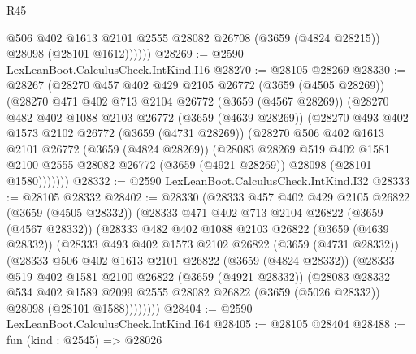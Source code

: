 \begin{lexlean}{R45}
\begin{coremodule}
              @506
              @402
              @1613
              @2101
              @2555
              @28082
              @26708
              (@3659 (@4824 @28215))
              @28098
              (@28101 @1612))))))
@28269 := @2590 LexLeanBoot.CalculusCheck.IntKind.I16
@28270 := @28105 @28269
@28330 := @28267
    (@28270
      @457
      @402
      @429
      @2105
      @26772
      (@3659 (@4505 @28269))
      (@28270
        @471
        @402
        @713
        @2104
        @26772
        (@3659 (@4567 @28269))
        (@28270
          @482
          @402
          @1088
          @2103
          @26772
          (@3659 (@4639 @28269))
          (@28270
            @493
            @402
            @1573
            @2102
            @26772
            (@3659 (@4731 @28269))
            (@28270
              @506
              @402
              @1613
              @2101
              @26772
              (@3659 (@4824 @28269))
              (@28083
                @28269
                @519
                @402
                @1581
                @2100
                @2555
                @28082
                @26772
                (@3659 (@4921 @28269))
                @28098
                (@28101 @1580)))))))
@28332 := @2590 LexLeanBoot.CalculusCheck.IntKind.I32
@28333 := @28105 @28332
@28402 := @28330
    (@28333
      @457
      @402
      @429
      @2105
      @26822
      (@3659 (@4505 @28332))
      (@28333
        @471
        @402
        @713
        @2104
        @26822
        (@3659 (@4567 @28332))
        (@28333
          @482
          @402
          @1088
          @2103
          @26822
          (@3659 (@4639 @28332))
          (@28333
            @493
            @402
            @1573
            @2102
            @26822
            (@3659 (@4731 @28332))
            (@28333
              @506
              @402
              @1613
              @2101
              @26822
              (@3659 (@4824 @28332))
              (@28333
                @519
                @402
                @1581
                @2100
                @26822
                (@3659 (@4921 @28332))
                (@28083
                  @28332
                  @534
                  @402
                  @1589
                  @2099
                  @2555
                  @28082
                  @26822
                  (@3659 (@5026 @28332))
                  @28098
                  (@28101 @1588))))))))
@28404 := @2590 LexLeanBoot.CalculusCheck.IntKind.I64
@28405 := @28105 @28404
@28488 := fun (kind : @2545) =>
  @28026

\end{coremodule}
\end{lexlean}
